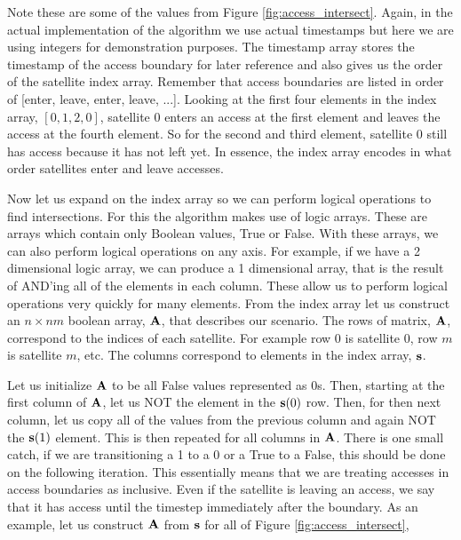 Note these are some of the values from Figure \ref{fig:access_intersect}.
Again, in the actual implementation of the algorithm we use actual timestamps
but here we are using integers for demonstration purposes. The timestamp array
stores the timestamp of the access boundary for later reference and also gives
us the order of the satellite index array. Remember that access boundaries are
listed in order of [enter, leave, enter, leave, ...]. Looking at the first four
elements in the index array, $[0, 1, 2, 0]$, satellite 0 enters an access at
the first element and leaves the access at the fourth element. So for the
second and third element, satellite 0 still has access because it has not left
yet. In essence, the index array encodes in what order satellites enter and
leave accesses. 

Now let us expand on the index array so we can perform logical operations to
find intersections. For this the algorithm makes use of logic arrays.  These
are arrays which contain only Boolean values, True or False. With these arrays,
we can also perform logical operations on any axis. For example, if we have a 2
dimensional logic array, we can produce a 1 dimensional array, that is the
result of AND'ing all of the elements in each column. These allow us to perform
logical operations very quickly for many elements. From the index array let us
construct an $n\times nm$ boolean array, $\bm{\mathrm{A}}$, that describes our scenario.
The rows of matrix, $\bm{\mathrm{A}}$, correspond to the indices of each satellite.  For
example row 0 is satellite 0, row $m$ is satellite $m$, etc. The columns
correspond to elements in the index array, $\bm{\mathrm{s}}$.

Let us initialize $\bm{\mathrm{A}}$ to be all False values represented as 0s. Then,
starting at the first column of $\bm{\mathrm{A}}$, let us NOT the element in the
$\bm{\mathrm{s}}(0)$ row.  Then, for then next column, let us copy all of the values
from the previous column and again NOT the $\bm{\mathrm{s}}(1)$ element. This is then
repeated for all columns in $\bm{\mathrm{A}}$. There is one small catch, if we are
transitioning a 1 to a 0 or a True to a False, this should be done on the
following iteration. This essentially means that we are treating accesses in
access boundaries as inclusive. Even if the satellite is leaving an access, we
say that it has access until the timestep immediately after the boundary. As an
example, let us construct $\bm{\mathrm{A}}$ from $\bm{\mathrm{s}}$ for all of Figure
\ref{fig:access_intersect},

